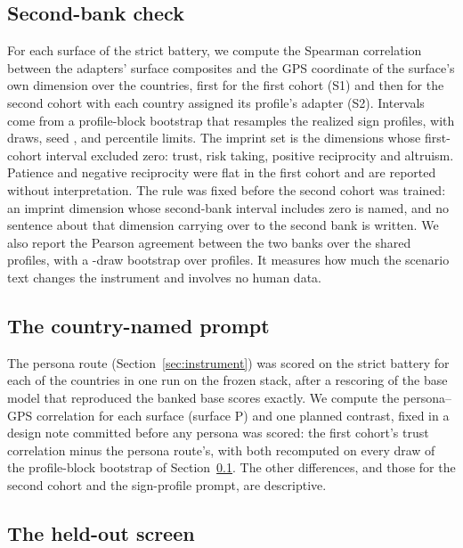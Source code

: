 \subsection{Second-bank check}\label{sec:design-bank}

For each surface of the strict battery, we compute the Spearman correlation between the adapters' surface composites and the GPS coordinate of the surface's own dimension over the  countries, first for the first cohort (S1) and then for the second cohort with each country assigned its profile's adapter (S2). Intervals come from a profile-block bootstrap that resamples the  realized sign profiles, with  draws, seed , and percentile limits. The imprint set is the  dimensions whose first-cohort interval excluded zero: trust, risk taking, positive reciprocity and altruism. Patience and negative reciprocity were flat in the first cohort and are reported without interpretation. The rule was fixed before the second cohort was trained: an imprint dimension whose second-bank interval includes zero is named, and no sentence about that dimension carrying over to the second bank is written. We also report the Pearson agreement between the two banks over the  shared profiles, with a -draw bootstrap over profiles. It measures how much the scenario text changes the instrument and involves no human data.

\subsection{The country-named prompt}\label{sec:design-persona}

The persona route (Section~\ref{sec:instrument}) was scored on the strict battery for each of the  countries in one run on the frozen stack, after a rescoring of the base model that reproduced the banked base scores exactly. We compute the persona--GPS correlation for each surface (surface P) and one planned contrast, fixed in a design note committed before any persona was scored: the first cohort's trust correlation minus the persona route's, with both recomputed on every draw of the profile-block bootstrap of Section~\ref{sec:design-bank}. The other differences, and those for the second cohort and the sign-profile prompt, are descriptive.

\subsection{The held-out screen}\label{sec:design-screen}

